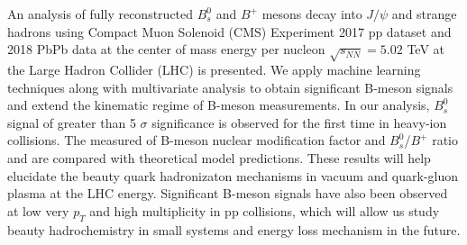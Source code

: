 % 
% 
%
An analysis of fully reconstructed $B^0_s$ and $B^+$ mesons decay into $J/\psi$ and strange hadrons using Compact Muon Solenoid (CMS) Experiment 2017 pp dataset and 2018 PbPb data at the center of mass energy per nucleon $\sqrt{s_{NN}} = 5.02$ TeV at the Large Hadron Collider (LHC) is presented. We apply machine learning techniques along with multivariate analysis to obtain significant B-meson signals and extend the kinematic regime of B-meson measurements. In our analysis, $B^0_s$ signal of greater than 5 $\sigma$ significance is observed for the first time in heavy-ion collisions. The measured of B-meson nuclear modification factor and $B^0_s$/$B^+$ ratio and are compared with theoretical model predictions. These results will help elucidate the beauty quark hadronizaton mechanisms in vacuum and quark-gluon plasma at the LHC energy. Significant B-meson signals have also been observed at low very $p_T$ and high multiplicity in pp collisions, which will allow us study beauty hadrochemistry in small systems and energy loss mechanism in the future. 